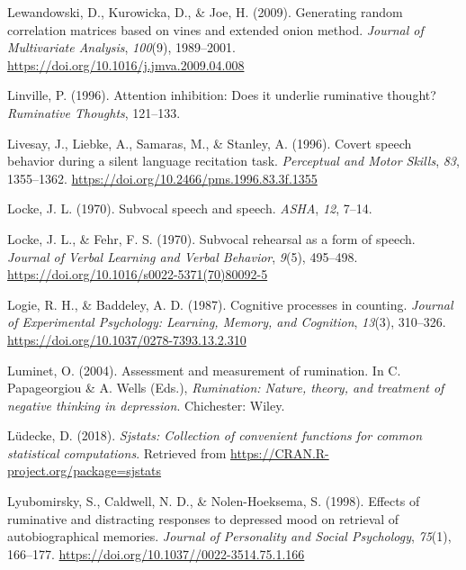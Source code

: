 \documentclass[a4paper,12pt,twoside,onecolumn,openright,final,oldfontcommands]{memoir}
\begin{document}
\leavevmode\hypertarget{ref-lewandowski_generating_2009}{}%
Lewandowski, D., Kurowicka, D., \& Joe, H. (2009). Generating random correlation matrices based on vines and extended onion method. \emph{Journal of Multivariate Analysis}, \emph{100}(9), 1989--2001. \url{https://doi.org/10.1016/j.jmva.2009.04.008}

\leavevmode\hypertarget{ref-linville_attention_1996}{}%
Linville, P. (1996). Attention inhibition: Does it underlie ruminative thought? \emph{Ruminative Thoughts}, 121--133.

\leavevmode\hypertarget{ref-livesay_covert_1996}{}%
Livesay, J., Liebke, A., Samaras, M., \& Stanley, A. (1996). Covert speech behavior during a silent language recitation task. \emph{Perceptual and Motor Skills}, \emph{83}, 1355--1362. \url{https://doi.org/10.2466/pms.1996.83.3f.1355}

\leavevmode\hypertarget{ref-locke_subvocal_1970-1}{}%
Locke, J. L. (1970). Subvocal speech and speech. \emph{ASHA}, \emph{12}, 7--14.

\leavevmode\hypertarget{ref-locke_subvocal_1970}{}%
Locke, J. L., \& Fehr, F. S. (1970). Subvocal rehearsal as a form of speech. \emph{Journal of Verbal Learning and Verbal Behavior}, \emph{9}(5), 495--498. \url{https://doi.org/10.1016/s0022-5371(70)80092-5}

\leavevmode\hypertarget{ref-logie_cognitive_1987}{}%
Logie, R. H., \& Baddeley, A. D. (1987). Cognitive processes in counting. \emph{Journal of Experimental Psychology: Learning, Memory, and Cognition}, \emph{13}(3), 310--326. \url{https://doi.org/10.1037/0278-7393.13.2.310}

\leavevmode\hypertarget{ref-luminet_assessment_2004}{}%
Luminet, O. (2004). Assessment and measurement of rumination. In C. Papageorgiou \& A. Wells (Eds.), \emph{Rumination: Nature, theory, and treatment of negative thinking in depression}. Chichester: Wiley.

\leavevmode\hypertarget{ref-R-sjstats}{}%
Lüdecke, D. (2018). \emph{Sjstats: Collection of convenient functions for common statistical computations}. Retrieved from \url{https://CRAN.R-project.org/package=sjstats}

\leavevmode\hypertarget{ref-Lyubomirsky1998}{}%
Lyubomirsky, S., Caldwell, N. D., \& Nolen-Hoeksema, S. (1998). Effects of ruminative and distracting responses to depressed mood on retrieval of autobiographical memories. \emph{Journal of Personality and Social Psychology}, \emph{75}(1), 166--177. \url{https://doi.org/10.1037//0022-3514.75.1.166}
\end{document}
